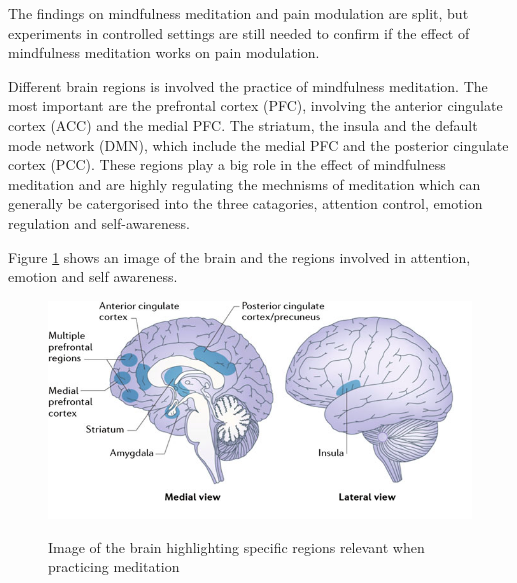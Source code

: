 The findings on mindfulness meditation and pain modulation are split, but experiments in controlled settings are still needed to confirm if the effect of mindfulness meditation works on pain modulation. \cite{Zeidan2012, Perlman2010}



Different brain regions is involved the practice of mindfulness meditation. The most important are the prefrontal cortex (PFC), involving the anterior cingulate cortex (ACC) and the medial PFC. The striatum, the insula and the default mode network (DMN), which include the medial PFC and the posterior cingulate cortex (PCC). These regions play a big role in the effect of mindfulness meditation and are highly regulating the mechnisms of meditation which can generally be catergorised into the three catagories, attention control, emotion regulation and self-awareness. 

Figure \ref{fig:brain_meditation} shows an image of the brain and the regions involved in attention, emotion and self awareness. 

\begin{figure}[H]
	\includegraphics[width=1\textwidth]{figures/brain_meditation.png} 
	\caption{Image of the brain highlighting specific regions relevant when practicing meditation}
	\label{fig:brain_meditation}  
	\cite{Tang2017}
\end{figure}   

